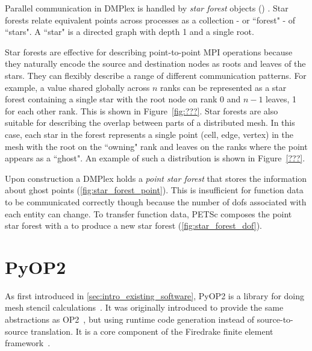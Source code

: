 \documentclass[thesis]{subfiles}
\begin{document}
Parallel communication in DMPlex is handled by \textit{star forest} objects () \parencite{zhangPetscSFScalableCommunication2021}.
Star forests relate equivalent points across processes as a collection - or ``forest" - of ``stars".
A ``star" is a directed graph with depth 1 and a single root.

Star forests are effective for describing point-to-point MPI operations because they naturally encode the source and destination nodes as roots and leaves of the stars.
They can flexibly describe a range of different communication patterns.
For example, a value shared globally across $n$ ranks can be represented as a star forest containing a single star with the root node on rank 0 and $n-1$ leaves, 1 for each other rank.
This is shown in Figure~\ref{fig:???}.
Star forests are also suitable for describing the overlap between parts of a distributed mesh.
In this case, each star in the forest represents a single point (cell, edge, vertex) in the mesh with the root on the ``owning" rank and leaves on the ranks where the point appears as a ``ghost".
An example of such a distribution is shown in Figure~\ref{???}.


Upon construction a DMPlex holds a \textit{point star forest} that stores the information about ghost points (\cref{fig:star_forest_point}).
This is insufficient for function data to be communicated correctly though because the number of \glspl{dof} associated with each entity can change.
To transfer function data, PETSc composes the point star forest with a  to produce a new star forest (\cref{fig:star_forest_dof}).



\section{PyOP2}


As first introduced in \cref{sec:intro_existing_software}, PyOP2 is a library for doing mesh stencil calculations~\cite{rathgeberPyOP2HighLevelFramework2012}.
It was originally introduced to provide the same abstractions as OP2~\cite{mudaligeOP2ActiveLibrary2012}, but using runtime code generation instead of source-to-source translation.
It is a core component of the Firedrake finite element framework~\cite{FiredrakeUserManual}.
\end{document}
